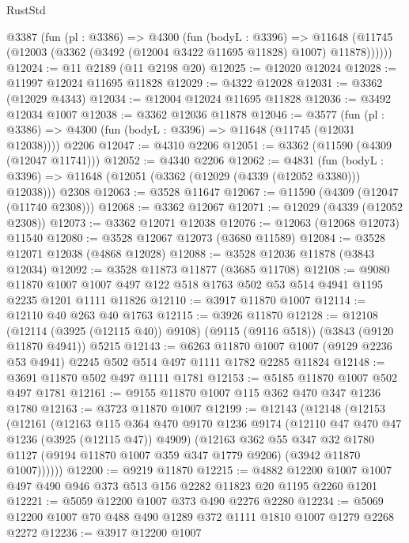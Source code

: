 \begin{lexlean}{RustStd}
\begin{coremodule}
    @3387
      (fun (pl : @3386) =>
      @4300
        (fun (bodyL : @3396) =>
        @11648 (@11745 (@12003 (@3362 (@3492 (@12004 @3422 @11695 @11828) @1007) @11878))))))
@12024 := @11 @2189 (@11 @2198 @20)
@12025 := @12020 @12024
@12028 := @11997 @12024 @11695 @11828
@12029 := @4322 @12028
@12031 := @3362 (@12029 @4343)
@12034 := @12004 @12024 @11695 @11828
@12036 := @3492 @12034 @1007
@12038 := @3362 @12036 @11878
@12046 := @3577
    (fun (pl : @3386) => @4300 (fun (bodyL : @3396) => @11648 (@11745 (@12031 @12038))))
    @2206
@12047 := @4310 @2206
@12051 := @3362 (@11590 (@4309 (@12047 @11741)))
@12052 := @4340 @2206
@12062 := @4831
    (fun (bodyL : @3396) => @11648 (@12051 (@3362 (@12029 (@4339 (@12052 @3380))) @12038)))
    @2308
@12063 := @3528 @11647
@12067 := @11590 (@4309 (@12047 (@11740 @2308)))
@12068 := @3362 @12067
@12071 := @12029 (@4339 (@12052 @2308))
@12073 := @3362 @12071 @12038
@12076 := @12063 (@12068 @12073) @11540
@12080 := @3528 @12067 @12073 (@3680 @11589)
@12084 := @3528 @12071 @12038 (@4868 @12028)
@12088 := @3528 @12036 @11878 (@3843 @12034)
@12092 := @3528 @11873 @11877 (@3685 @11708)
@12108 := @9080
    @11870
    @1007
    @1007
    @497
    @122
    @518
    @1763
    @502
    @53
    @514
    @4941
    @1195
    @2235
    @1201
    @1111
    @11826
@12110 := @3917 @11870 @1007
@12114 := @12110 @40 @263 @40 @1763
@12115 := @3926 @11870
@12128 := @12108
    (@12114 (@3925 (@12115 @40)) @9108)
    (@9115 (@9116 @518))
    (@3843 (@9120 @11870 @4941))
    @5215
@12143 := @6263
    @11870
    @1007
    @1007
    (@9129 @2236 @53 @4941)
    @2245
    @502
    @514
    @497
    @1111
    @1782
    @2285
    @11824
@12148 := @3691 @11870 @502 @497 @1111 @1781
@12153 := @5185 @11870 @1007 @502 @497 @1781
@12161 := @9155 @11870 @1007 @115 @362 @470 @347 @1236 @1780
@12163 := @3723 @11870 @1007
@12199 := @12143
    (@12148
      (@12153
        (@12161
          (@12163
            @115
            @364
            @470
            @9170
            @1236
            @9174
            (@12110 @47 @470 @47 @1236 (@3925 (@12115 @47)) @4909)
            (@12163
              @362
              @55
              @347
              @32
              @1780
              @1127
              (@9194 @11870 @1007 @359 @347 @1779 @9206)
              (@3942 @11870 @1007))))))
@12200 := @9219 @11870
@12215 := @4882 @12200 @1007 @1007 @497 @490 @946 @373 @513 @156 @2282 @11823 @20 @1195 @2260 @1201
@12221 := @5059 @12200 @1007 @373 @490 @2276 @2280
@12234 := @5069 @12200 @1007 @70 @488 @490 @1289 @372 @1111 @1810 @1007 @1279 @2268 @2272
@12236 := @3917 @12200 @1007

\end{coremodule}
\end{lexlean}
